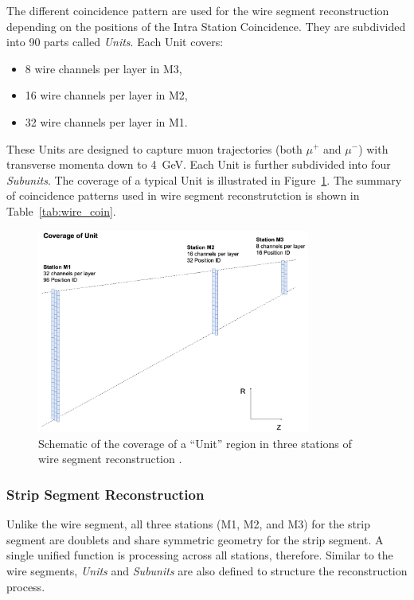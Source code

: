 The different coincidence pattern are used for the wire segment reconstruction depending on the positions of the Intra Station Coincidence. They are subdivided into 90 parts called \textit{Units}. Each Unit covers:
\begin{itemize}
  \item 8 wire channels per layer in M3,
  \item 16 wire channels per layer in M2,
  \item 32 wire channels per layer in M1.
\end{itemize}
These Units are designed to capture muon trajectories (both $\mu^+$ and $\mu^-$) with transverse momenta down to 4~GeV. Each Unit is further subdivided into four \textit{Subunits}. The coverage of a typical Unit is illustrated in Figure~\ref{fig:wire_unit}. The summary of coincidence patterns used in wire segment reconstrutction is shown in Table~\ref{tab:wire_coin}.


\begin{figure}[htbp]
  \centering
  \includegraphics[width=0.8\textwidth]{figs/chapter5/wire_unit.png}
  \caption{Schematic of the coverage of a ``Unit'' region in three stations of wire segment reconstruction \cite{EndcapSLPDR}.}
  \label{fig:wire_unit}
\end{figure}

\subsubsection{Strip Segment Reconstruction}

Unlike the wire segment, all three stations (M1, M2, and M3) for the strip segment are doublets and share symmetric geometry for the strip segment. A single unified function is processing across all stations, therefore. Similar to the wire segments, \textit{Units} and \textit{Subunits} are also defined to structure the reconstruction process.

